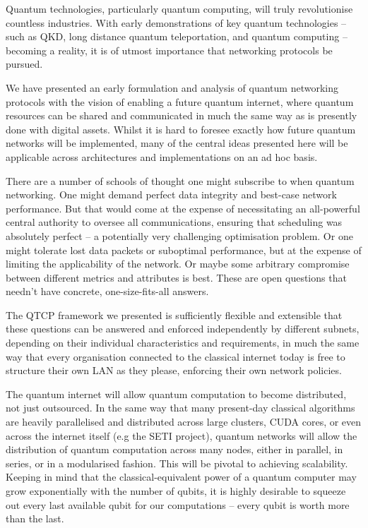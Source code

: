 \documentclass[aps,rmp,twocolumn,amsmath,amssymb,nofootinbib,superscriptaddress,longbibliography,floatfix,table-of-contents,eqsecnum]{revtex4-1}
\begin{document}
Quantum technologies, particularly quantum computing, will truly revolutionise countless industries. With early demonstrations of key quantum technologies -- such as QKD, long distance quantum teleportation, and quantum computing -- becoming a reality, it is of utmost importance that networking protocols be pursued.

We have presented an early formulation and analysis of quantum networking protocols with the vision of enabling a future quantum internet, where quantum resources can be shared and communicated in much the same way as is presently done with digital assets. Whilst it is hard to foresee exactly how future quantum networks will be implemented, many of the central ideas presented here will be applicable across architectures and implementations on an ad hoc basis.

There are a number of schools of thought one might subscribe to when quantum networking. One might demand perfect data integrity and best-case network performance. But that would come at the expense of necessitating an all-powerful central authority to oversee all communications, ensuring that scheduling was absolutely perfect -- a potentially very challenging optimisation problem. Or one might tolerate lost data packets or suboptimal performance, but at the expense of limiting the applicability of the network. Or maybe some arbitrary compromise between different metrics and attributes is best. These are open questions that needn't have concrete, one-size-fits-all answers.

The QTCP framework we presented is sufficiently flexible and extensible that these questions can be answered and enforced independently by different subnets, depending on their individual characteristics and requirements, in much the same way that every organisation connected to the classical internet today is free to structure their own LAN as they please, enforcing their own network policies.

The quantum internet will allow quantum computation to become distributed, not just outsourced. In the same way that many present-day classical algorithms are heavily parallelised and distributed across large clusters, CUDA cores, or even across the internet itself (e.g the SETI project), quantum networks will allow the distribution of quantum computation across many nodes, either in parallel, in series, or in a modularised fashion. This will be pivotal to achieving scalability. Keeping in mind that the classical-equivalent power of a quantum computer may grow exponentially with the number of qubits, it is highly desirable to squeeze out every last available qubit for our computations -- every qubit is worth more than the last.
\end{document}
